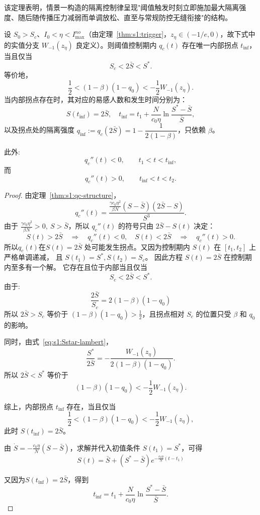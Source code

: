 \documentclass[lang=cn,a4paper,newtx]{elegantpaper}
\numberwithin{equation}{section}
\theoremstyle{plain}
\newcommand{\qinf}{q_{\mathrm{inf}}}
\begin{document}
\begin{remark}
该定理表明，情景一构造的隔离控制律呈现"阈值触发时刻立即施加最大隔离强度、随后随传播压力减弱而单调放松、直至与常规防控无缝衔接"的结构。
\end{remark}



\begin{theorem}[阈值隔离控制的拐点]\label{thm:s1:inflection}
    设 $S_0>S_c$、$I_0<\eta<I_{\max}^{no}$（由定理~\ref{thm:s1:trigger}，$z_\eta\in(-1/e,0)$，故下式中的实值分支 $W_{-1}(z_\eta)$ 良定义）。则阈值控制期内 $q_c(t)$ 存在唯一内部拐点 $t_{\mathrm{inf}}$，当且仅当
    \[
    S_c<2\bar S<S^*.
    \]
    等价地，
    \[
    \frac{1}{2}
    <(1-\beta)(1-q_0)
    <-\frac{1}{2}W_{-1}(z_\eta).
    \]
    当内部拐点存在时，其对应的易感人数和发生时间分别为：
    \[
    S(t_{\mathrm{inf}})=2\bar S,\quad
    t_{\mathrm{inf}}
    =
    t_1+\frac{N}{c_0\eta}\ln\frac{S^*-\bar S}{\bar S},
    \]
    以及拐点处的隔离强度 $\qinf:=q_c(2\bar S)=1-\dfrac{1}{2(1-\beta)}$，只依赖 $\beta$。

    此外:
    \[
    q_c''(t)<0,
    \qquad t_1<t<t_{\mathrm{inf}},
    \]
    而
    \[
    q_c''(t)>0,
    \qquad t_{\mathrm{inf}}<t<t_2.
    \]
\end{theorem}
\begin{proof}
    由定理~\ref{thm:s1:qc-structure}，
    \[
    q_c''(t)
    =
    \frac{\frac{\gamma c_0\eta^2}{\beta N}(S-\bar S)(2\bar S-S)}{S^3}.
    \]
    由于 \(\frac{\gamma c_0\eta^2}{\beta N}>0,\ S>\bar S\)，所以 $q_c''(t)$ 的符号只由 $2\bar S-S(t)$ 决定：
    \[
    S(t)>2\bar S
    \quad\Rightarrow\quad
    q_c''(t)<0,
    \quad S(t)<2\bar S
    \quad\Rightarrow\quad
    q_c''(t)>0.
    \]
    所以$q_c(t)$在$S(t)=2\bar S$ 处可能发生拐点。又因为控制期内 \(S(t)\) 在 \([t_1,t_2]\) 上严格单调递减，
    且 \(S(t_1)=S^*, S(t_2)=S_c\)。
    因此方程 \(S(t)=2\bar S\) 在控制期内至多有一个解。
    它存在且位于内部当且仅当
    \[
    S_c<2\bar S<S^*.
    \]
    由于:
    \[
    \frac{2\bar{S}}{S_c}=2(1-\beta)(1-q_0)
    \]
    所以 $2\bar S>S_c$ 等价于 $(1-\beta)(1-q_0)>\frac{1}{2}$，且拐点相对 $S_c$ 的位置只受 $\beta$ 和 $q_0$ 的影响。
    
    同时，由式~\eqref{eq:s1:Sstar-lambert}，
    \[
    \frac{S^*}{2\bar S}
    =
    -\frac{W_{-1}(z_\eta)}
    {2(1-\beta)(1-q_0)}.
    \]
    所以 $2\bar S<S^*$ 等价于
    \[
    (1-\beta)(1-q_0)<-\frac{1}{2}W_{-1}(z_\eta).
    \]

    综上，内部拐点 $t_{\mathrm{inf}}$ 存在，当且仅当
    \[
    \frac{1}{2}
    <(1-\beta)(1-q_0)
    <-\frac{1}{2}W_{-1}(z_\eta),
    \]
    此时 $S(t_{\mathrm{inf}})=2\bar S$。
    
    由 $\dot{S}=-\frac{c_0\eta}{N}(S-\bar S)$，求解并代入初值条件 $S(t_1)=S^*$，可得
    \[
    S(t)=\bar S+(S^*-\bar S)
    e^{-\frac{c_0\eta}{N}(t-t_1)}
    \]

    又因为\(S(t_{\mathrm{inf}})=2\bar S\)，得到
    \[
    t_{\mathrm{inf}}
    =
    t_1+
    \frac{N}{c_0\eta}
    \ln\frac{S^*-\bar S}{\bar S}.
    \]
\end{proof}
\end{document}
